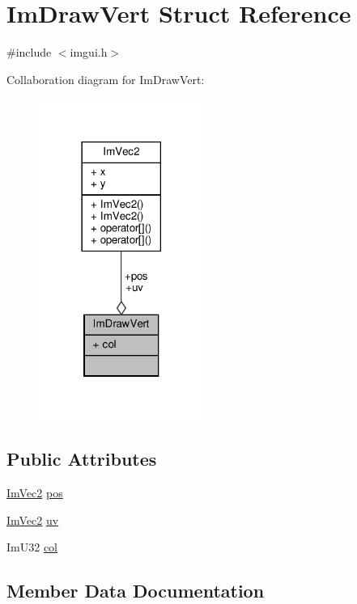 \hypertarget{structImDrawVert}{}\section{Im\+Draw\+Vert Struct Reference}
\label{structImDrawVert}


{\ttfamily \#include $<$imgui.\+h$>$}



Collaboration diagram for Im\+Draw\+Vert\+:
\nopagebreak
\begin{figure}[H]
\begin{center}
\leavevmode
\includegraphics[width=153pt]{structImDrawVert__coll__graph}
\end{center}
\end{figure}
\subsection*{Public Attributes}
\begin{DoxyCompactItemize}
\item 
\hyperlink{structImVec2}{Im\+Vec2} \hyperlink{structImDrawVert_aedc578bbf364ddea71be12b4f177a5b4}{pos}
\item 
\hyperlink{structImVec2}{Im\+Vec2} \hyperlink{structImDrawVert_abdf3183529055a6c3f709b23a4bf06b1}{uv}
\item 
Im\+U32 \hyperlink{structImDrawVert_ab98ba53ce2690b56f5ba94682ed83940}{col}
\end{DoxyCompactItemize}


\subsection{Member Data Documentation}
\mbox{\label{structImDrawVert_ab98ba53ce2690b56f5ba94682ed83940}} 
